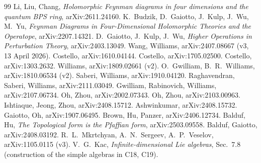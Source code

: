 \documentclass[10pt,a4paper]{article}
\numberwithin{equation}{section}
\theoremstyle{definition}
\theoremstyle{remark}
\begin{document}
\begin{thebibliography}{99}\small
{} Li, Liu, Chang, \emph{Holomorphic Feynman diagrams in four dimensions and the quantum BPS ring}, arXiv:2611.24160.
 K.~Budzik, D.~Gaiotto, J.~Kulp, J.~Wu, M.~Yu, \emph{Feynman Diagrams in Four-Dimensional Holomorphic Theories and the Operatope}, arXiv:2207.14321.
 D.~Gaiotto, J.~Kulp, J.~Wu, \emph{Higher Operations in Perturbation Theory}, arXiv:2403.13049.
 Wang, Williams, arXiv:2407.08667 (v3, 13 April 2026).
 Costello, arXiv:1610.04144.
 Costello, arXiv:1705.02500.
 Costello, arXiv:1303.2632.
 Williams, arXiv:1809.02661 (v2).
 O.~Gwilliam, B.~R.~Williams, arXiv:1810.06534 (v2).
 Saberi, Williams, arXiv:1910.04120.
 Raghavendran, Saberi, Williams, arXiv:2111.03049.
 Gwilliam, Rabinovich, Williams, arXiv:2107.06734.
 Oh, Zhou, arXiv:2002.07343.
 Oh, Zhou, arXiv:2103.00963.
 Ishtiaque, Jeong, Zhou, arXiv:2408.15712.
 Ashwinkumar, arXiv:2408.15732.
 Gaiotto, Oh, arXiv:1907.06495.
 Brown, Hu, Panzer, arXiv:2406.12734.
 Balduf, Hu, \emph{The Topological form is the Pfaffian form}, arXiv:2503.09558.
 Balduf, Gaiotto, arXiv:2408.03192.
 R.~L.~Mkrtchyan, A.~N.~Sergeev, A.~P.~Veselov, arXiv:1105.0115 (v3).
 V.~G.~Kac, \emph{Infinite-dimensional Lie algebras}, Sec.~7.8 (construction of the simple algebras in C18, C19).
\end{thebibliography}
\end{document}
